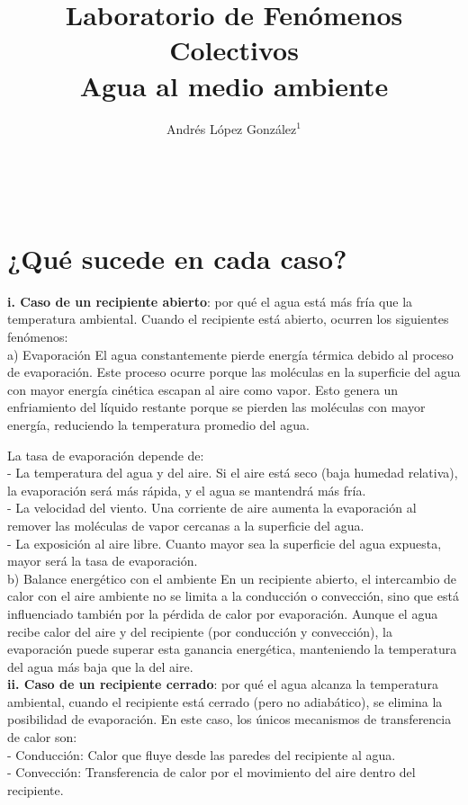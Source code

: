 \documentclass[article,12pt]{elsarticle}
\begin{document}
\begin{frontmatter}
    \title{Laboratorio de Fenómenos Colectivos \\ Agua al medio ambiente} \\
    \author{Andrés López González$^1$} %
    \address{$^1$ Facultad de Ciencias, Universidad Nacional Autónoma de México, M\'exico CDMX.}
\end{frontmatter}
\section{¿Qué sucede en cada caso?}

\textbf{i. Caso de un recipiente abierto}: por qué el agua está más fría que la temperatura ambiental. 
Cuando el recipiente está abierto, ocurren los siguientes fenómenos: \\

a) Evaporación
El agua constantemente pierde energía térmica debido al proceso de evaporación. Este proceso ocurre porque las moléculas en la superficie del agua con mayor energía cinética escapan al aire como vapor. Esto genera un enfriamiento del líquido restante porque se pierden las moléculas con mayor energía, reduciendo la temperatura promedio del agua.

La tasa de evaporación depende de:\\
- La temperatura del agua y del aire. Si el aire está seco (baja humedad relativa), la evaporación será más rápida, y el agua se mantendrá más fría.\\
- La velocidad del viento. Una corriente de aire aumenta la evaporación al remover las moléculas de vapor cercanas a la superficie del agua.\\
- La exposición al aire libre. Cuanto mayor sea la superficie del agua expuesta, mayor será la tasa de evaporación. \\

b) Balance energético con el ambiente
En un recipiente abierto, el intercambio de calor con el aire ambiente no se limita a la conducción o convección, sino que está influenciado también por la pérdida de calor por evaporación. Aunque el agua recibe calor del aire y del recipiente (por conducción y convección), la evaporación puede superar esta ganancia energética, manteniendo la temperatura del agua más baja que la del aire. \\

\textbf{ii. Caso de un recipiente cerrado}: por qué el agua alcanza la temperatura ambiental, cuando el recipiente está cerrado (pero no adiabático), se elimina la posibilidad de evaporación. En este caso, los únicos mecanismos de transferencia de calor son:\\
- Conducción: Calor que fluye desde las paredes del recipiente al agua.\\
- Convección: Transferencia de calor por el movimiento del aire dentro del recipiente.\\
  
\end{document}
